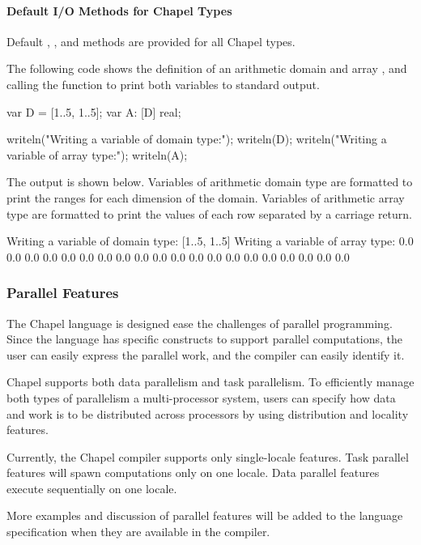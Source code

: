 \paragraph{Default I/O Methods for Chapel Types}
Default , , and  methods are 
provided for all Chapel types.  

\begin{example}
The following code shows the definition of an arithmetic domain 
and array , and calling the  function
to print both variables to standard output.  
\begin{chapel}
var D = [1..5, 1..5];
var A: [D] real;

writeln("Writing a variable of domain type:");
writeln(D);
writeln("Writing a variable of array type:");
writeln(A);
\end{chapel}

The output is shown below.  Variables of arithmetic domain type are 
formatted to print the ranges for each dimension of the domain.  Variables
of arithmetic array type are formatted to print the values of each row
separated by a carriage return.
\begin{commandline}
Writing a variable of domain type:
[1..5, 1..5]
Writing a variable of array type:
0.0 0.0 0.0 0.0 0.0
0.0 0.0 0.0 0.0 0.0
0.0 0.0 0.0 0.0 0.0
0.0 0.0 0.0 0.0 0.0
\end{commandline}
\end{example}

\subsubsection{Parallel Features}
The Chapel language is designed ease the challenges of parallel 
programming.  Since the language has specific constructs to support
parallel computations, the user can easily express the parallel 
work, and the compiler can easily identify it.

Chapel supports both data parallelism and task
parallelism.  To efficiently manage both types of parallelism 
a multi-processor system, users can specify how data and
work is to be distributed across processors by using
distribution and locality features.

\begin{status}
Currently, the Chapel compiler supports only single-locale features.
Task parallel features will spawn computations only on one locale.
Data parallel features execute sequentially on one locale.  

More examples and discussion of parallel features will be added to
the language specification when they are available in the compiler.
\end{status}

